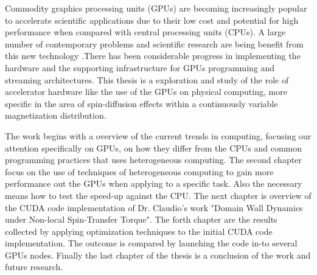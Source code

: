 \documentclass[11pt, oneside, a4paper]{Thesis} %
\begin{document}
\pagestyle{fancy} %

\tableofcontents %

\listoffigures %





\introductions

\bigskip

Commodity graphics processing units (GPUs) are becoming increasingly popular to accelerate scientific applications due to their low cost and potential for high performance when compared with central processing units (CPUs). A large number of contemporary problems and scientific research are being benefit from this new technology .There has been considerable progress in implementing the hardware and the supporting infrastructure for GPUs programming and streaming architectures. This thesis is a exploration and study of the role of accelerator hardware like the use of the GPUs on physical computing, more specific in the area of spin-diffusion effects within a continuously variable magnetization distribution.

The work begins with a overview of the current trends in computing, focusing our attention specifically on GPUs, on how they differ from the CPUs and common programming practices that uses heterogeneous computing. The second chapter focus on the use of techniques of heterogeneous computing to gain more performance out the GPUs when applying to a specific task. Also the necessary means how to test the speed-up against the CPU.  The next chapter is overview of the CUDA code implementation of Dr. Claudio's work "Domain Wall Dynamics under Non-local Spin-Transfer Torque". The forth chapter are the results collected by applying optimization techniques to the initial CUDA code implementation. The outcome is compared by launching the code in-to several GPUs nodes. Finally the last chapter of the thesis is a conclusion of the work and future research.
\end{document}
